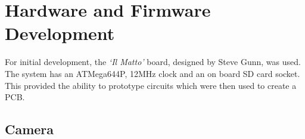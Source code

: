\chapter{Hardware and Firmware Development} \label{Chapter:HardwareDevelopment}
For initial development, the \textit{`Il Matto'} board, designed by Steve Gunn, was used. The system has an ATMega644P, 12MHz clock and an on board SD card socket. This provided the ability to prototype circuits which were then used to create a PCB.


\section{Camera} \label{Section:Camera}

